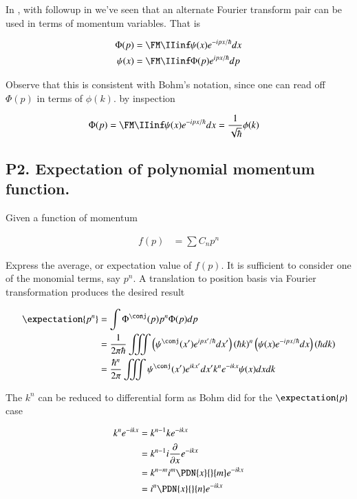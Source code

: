 \documentclass{article}
\begin{document}
In \cite{mcmahon2005qmd}, with followup in \cite{PJqmFourier} we've seen that an alternate Fourier transform pair can be used in terms of
momentum variables.  That is

\begin{align*}
\Phi(p) &= \FM \IIinf \psi(x) e^{-ipx/\hbar} dx \\
\psi(x) &= \FM \IIinf \Phi(p) e^{ipx/\hbar} dp \\
\end{align*}

Observe that this is consistent with Bohm's notation, since one can read off 
$\Phi(p)$ in terms of $\phi(k)$.
by inspection

\begin{align*}
\Phi(p) &= \FM \IIinf \psi(x) e^{-ipx/\hbar} dx = \inv{\sqrt{\hbar}} \phi(k)
\end{align*}

\subsection{P2. Expectation of polynomial momentum function. }

Given a function of momentum 

\begin{align*}
f(p) &= \sum C_n p^n
\end{align*}

Express the average, or expectation value of $f(p)$.  It is sufficient to consider one of the monomial terms, say $p^n$.  A translation 
to position basis via Fourier transformation produces the desired result

\begin{align*}
\expectation{p^n} 
&= \int \Phi^\conj(p) p^n \Phi(p) dp \\
&= \inv{2\pi \hbar} \iiint \left( \psi^\conj(x') e^{ipx'/\hbar} dx' \right) (\hbar k)^n \left( \psi(x) e^{-ipx/\hbar} dx \right) (\hbar dk) \\
&= \frac{\hbar^n}{2\pi } \iiint \psi^\conj(x') e^{ikx'} dx' k^n e^{-i k x} \psi(x) dx dk \\
\end{align*}

The $k^n$ can be reduced to differential form as Bohm did for the $\expectation{p}$ case

\begin{align*}
k^n e^{-i k x} 
&= k^{n-1} k e^{-i k x} \\
&= k^{n-1} i \PD{x}{}e^{-i k x} \\
&= k^{n-m} i^m \PDN{x}{}{m}e^{-i k x} \\
&= i^n \PDN{x}{}{n}e^{-i k x} \\
\end{align*}
\end{document}

